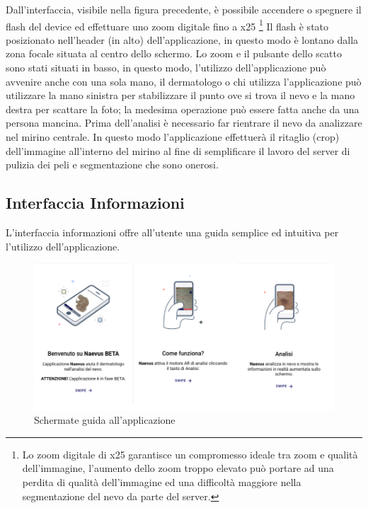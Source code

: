 {Dall'interfaccia, visibile nella figura precedente, è possibile accendere o spegnere il flash del device ed effettuare uno zoom digitale fino a x25 \footnote{Lo zoom digitale di x25 garantisce un compromesso ideale tra zoom e qualità dell'immagine, l'aumento dello zoom troppo elevato può portare ad una perdita di qualità dell'immagine ed una difficoltà maggiore nella segmentazione del nevo da parte del server.}
\newline
Il flash è stato posizionato nell'header (in alto) dell'applicazione, in questo modo è lontano dalla zona focale situata al centro dello schermo. 
Lo zoom e il pulsante dello scatto sono stati situati in basso, in questo modo, l'utilizzo dell'applicazione può avvenire anche con una sola mano, il dermatologo o chi utilizza l'applicazione può utilizzare la mano sinistra per stabilizzare il punto ove si trova il nevo e la mano destra per scattare la foto; la medesima operazione può essere fatta anche da una persona mancina.
\newline
Prima dell'analisi è necessario far rientrare il nevo da analizzare nel mirino centrale. In questo modo l'applicazione effettuerà il ritaglio (crop) dell'immagine all'interno del mirino al fine di semplificare il lavoro del server di pulizia dei peli e segmentazione che sono onerosi.
\newpage
\subsection{Interfaccia Informazioni}
L'interfaccia informazioni offre all'utente una guida semplice ed intuitiva per l'utilizzo dell'applicazione.
\begin{figure}[h]
	\begin{center}
		\includegraphics[scale=0.32]{figure/capitolo5/loading.png}
	\end{center}
	\caption{Schermate guida  all'applicazione}	
\end{figure}

}
